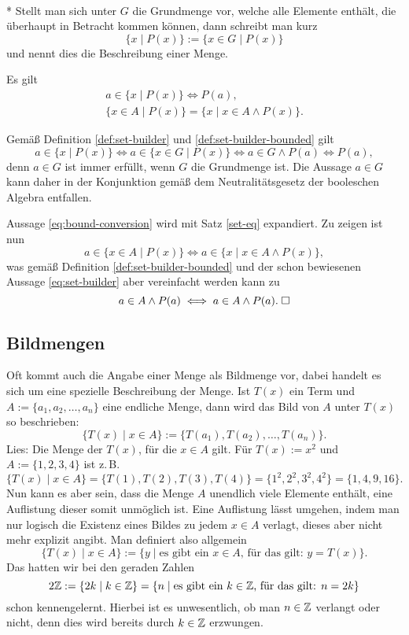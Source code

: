 \begin{Definition}%
\label{def:set-builder}\mbox{}\\*
Stellt man sich unter $G$ die Grundmenge vor, welche
alle Elemente enthält, die überhaupt in Betracht kommen können,
dann schreibt man kurz%
\[\{x\mid P(x)\} := \{x\in G\mid P(x)\}\]
und nennt dies die Beschreibung einer Menge.
\end{Definition}
\begin{Satz}
Es gilt
\begin{gather}
\label{eq:set-builder}
a\in\{x\mid P(x)\}\iff P(a),\\
\label{eq:bound-conversion}
\{x\in A\mid P(x)\} = \{x\mid x\in A\land P(x)\}.
\end{gather}
\end{Satz}
 Gemäß Definition \ref{def:set-builder}
und \ref{def:set-builder-bounded} gilt%
\[a\in\{x\mid P(x)\} \iff a\in\{x\in G\mid P(x)\}
\iff a\in G\land P(a)\iff P(a),\]
denn $a\in G$ ist immer erfüllt, wenn $G$ die Grundmenge ist.
Die Aussage $a\in G$ kann daher in der Konjunktion gemäß dem
Neutralitätsgesetz der booleschen Algebra entfallen.

Aussage \eqref{eq:bound-conversion} wird mit Satz \ref{set-eq}
expandiert. Zu zeigen ist nun
\[a\in\{x\in A\mid P(x)\}\iff a\in\{x\mid x\in A\land P(x)\},\]
was gemäß Definition \ref{def:set-builder-bounded} und der schon
bewiesenen Aussage \eqref{eq:set-builder} aber vereinfacht
werden kann zu
\[a\in A\land P(a)\iff a\in A\land P(a).\;\Box\]


\subsection{Bildmengen}

Oft kommt auch die Angabe einer Menge als Bildmenge vor, dabei
handelt es sich um eine spezielle Beschreibung der Menge. Ist
$T(x)$ ein Term und $A:=\{a_1,a_2,\ldots,a_n\}$ eine endliche
Menge, dann wird das Bild von $A$ unter $T(x)$ so beschrieben:
\[\{T(x)\mid x\in A\} := \{T(a_1),T(a_2),\ldots, T(a_n)\}.\]
Lies: Die Menge der $T(x)$, für die $x\in A$ gilt.
Für $T(x):=x^2$ und $A:=\{1,2,3,4\}$ ist z.\,B.
\[\{T(x)\mid x\in A\} = \{T(1), T(2), T(3), T(4)\}
= \{1^2,2^2,3^2,4^2\} = \{1,4,9,16\}.\]
Nun kann es aber sein, dass die Menge $A$ unendlich viele Elemente
enthält, eine Auflistung dieser somit unmöglich ist. Eine Auflistung
lässt umgehen, indem man nur logisch die Existenz eines Bildes
zu jedem $x\in A$ verlagt, dieses aber nicht mehr explizit angibt.
Man definiert also allgemein
\[\{T(x)\mid x\in A\} := \{y\mid\text{es gibt ein $x\in A$, für das gilt: $y=T(x)$}\}.\]
Das hatten wir bei den geraden Zahlen
\[2\mathbb Z := \{2k\mid k\in\mathbb Z\} = \{n\mid\text{es gibt ein $k\in\mathbb Z$, für das gilt: $n=2k$}\}\]
schon kennengelernt. Hierbei ist es unwesentlich, ob man $n\in\mathbb Z$ verlangt
oder nicht, denn dies wird bereits durch $k\in\mathbb Z$ erzwungen.

